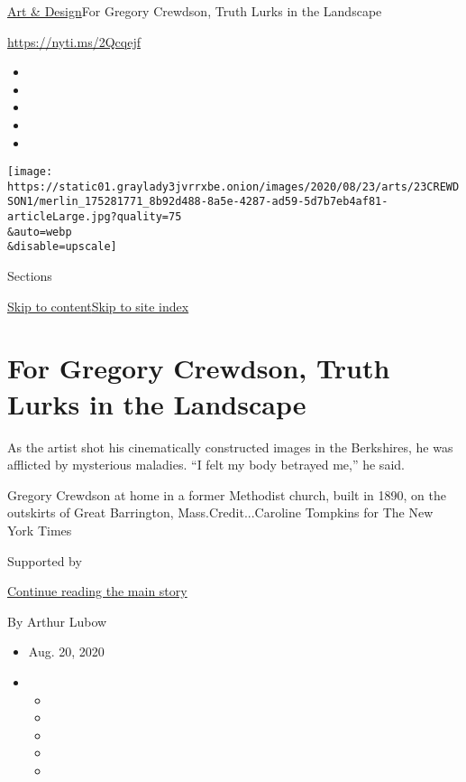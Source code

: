 \href{/section/arts/design}{Art \& Design}\textbar{}For Gregory
Crewdson, Truth Lurks in the Landscape

\url{https://nyti.ms/2Qcqejf}

\begin{itemize}
\item
\item
\item
\item
\item
\end{itemize}

\texttt{[image: https://static01.graylady3jvrrxbe.onion/images/2020/08/23/arts/23CREWDSON1/merlin\_175281771\_8b92d488-8a5e-4287-ad59-5d7b7eb4af81-articleLarge.jpg?quality=75\\\&auto=webp\\\&disable=upscale]}

Sections

\protect\hyperlink{site-content}{Skip to
content}\protect\hyperlink{site-index}{Skip to site index}

\hypertarget{for-gregory-crewdson-truth-lurks-in-the-landscape}{%
\section{For Gregory Crewdson, Truth Lurks in the
Landscape}\label{for-gregory-crewdson-truth-lurks-in-the-landscape}}

As the artist shot his cinematically constructed images in the
Berkshires, he was afflicted by mysterious maladies. ``I felt my body
betrayed me,'' he said.

Gregory Crewdson at home in a former Methodist church, built in 1890, on
the outskirts of Great Barrington, Mass.Credit...Caroline Tompkins for
The New York Times

Supported by

\protect\hyperlink{after-sponsor}{Continue reading the main story}

By Arthur Lubow

\begin{itemize}
\item
  Aug. 20, 2020
\item
  \begin{itemize}
  \item
  \item
  \item
  \item
  \item
  \end{itemize}
\end{itemize}

